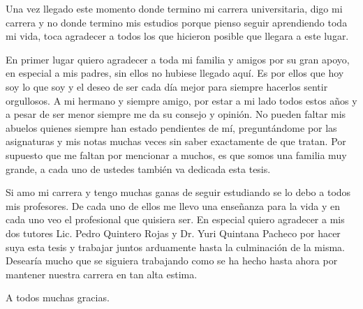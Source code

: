 \begin{acknowledgements}

Una vez llegado este momento donde termino mi carrera universitaria, digo mi carrera y no donde termino mis estudios porque pienso seguir aprendiendo toda mi vida, toca agradecer a todos los que hicieron posible que llegara a este lugar.

En primer lugar quiero agradecer a toda mi familia y amigos por su gran apoyo, en especial a mis padres, sin ellos no hubiese llegado aqu\'i. Es por ellos que hoy soy lo que soy y el deseo de ser cada d\'ia mejor para siempre hacerlos sentir orgullosos. A mi hermano y siempre amigo, por estar a mi lado todos estos a\~nos y a pesar de ser menor siempre me da su consejo y opini\'on. No pueden faltar mis abuelos quienes siempre han estado pendientes de m\'i, pregunt\'andome por las asignaturas y mis notas muchas veces sin saber exactamente de que tratan. Por supuesto que me faltan por mencionar a muchos, es que somos una familia muy grande, a cada uno de ustedes tambi\'en va dedicada esta tesis.

Si amo mi carrera y tengo muchas ganas de seguir estudiando se lo debo a todos mis profesores. De cada uno de ellos me llevo una ense\~nanza para la vida y en cada uno veo el profesional que quisiera ser. En especial quiero agradecer a mis dos tutores Lic. Pedro Quintero Rojas y Dr. Yuri Quintana Pacheco por hacer suya esta tesis y trabajar juntos arduamente hasta la culminaci\'on de la misma. Desear\'ia mucho que se siguiera trabajando como se ha hecho hasta ahora por mantener nuestra carrera en tan alta estima.

A todos muchas gracias.

\end{acknowledgements}